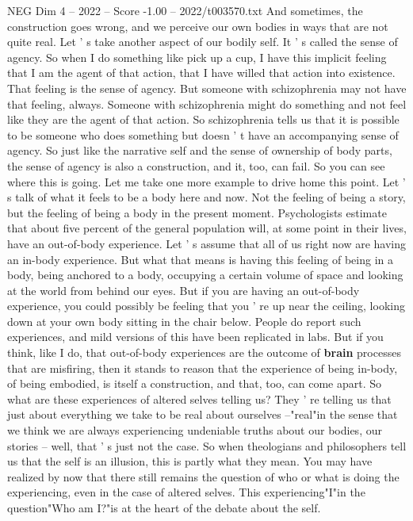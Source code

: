 \begin{textsample}{NEG Dim 4 – 2022 – Score -1.00 – 2022/t003570.txt}
And sometimes, the construction goes wrong, and we perceive our own bodies in ways that are not quite real.
Let ' s take another aspect of our bodily self.
It ' s called the sense of agency.
So when I do something like pick up a cup, I have this implicit feeling that I am the agent of that action, that I have willed that action into existence.
That feeling is the sense of agency.
But someone with schizophrenia may not have that feeling, always.
Someone with schizophrenia might do something and not feel like they are the agent of that action.
So schizophrenia tells us that it is possible to be someone who does something but doesn ' t have an accompanying sense of agency.
So just like the narrative self and the sense of ownership of body parts, the sense of agency is also a construction, and it, too, can fail.
So you can see where this is going.
Let me take one more example to drive home this point.
Let ' s talk of what it feels to be a body here and now.
Not the feeling of being a story, but the feeling of being a body in the present moment.
Psychologists estimate that about five percent of the general population will, at some point in their lives, have an out-of-body experience.
Let ' s assume that all of us right now are having an in-body experience.
But what that means is having this feeling of being in a body, being anchored to a body, occupying a certain volume of space and looking at the world from behind our eyes.
But if you are having an out-of-body experience, you could possibly be feeling that you ' re up near the ceiling, looking down at your own body sitting in the chair below.
People do report such experiences, and mild versions of this have been replicated in labs.
But if you think, like I do, that out-of-body experiences are the outcome of \textbf{brain} processes that are misfiring, then it stands to reason that the experience of being in-body, of being embodied, is itself a construction, and that, too, can come apart.
So what are these experiences of altered selves telling us?
They ' re telling us that just about everything we take to be real about ourselves --"real"in the sense that we think we are always experiencing undeniable truths about our bodies, our stories -- well, that ' s just not the case.
So when theologians and philosophers tell us that the self is an illusion, this is partly what they mean.
You may have realized by now that there still remains the question of who or what is doing the experiencing, even in the case of altered selves.
This experiencing"I"in the question"Who am I?"is at the heart of the debate about the self.

\end{textsample}
